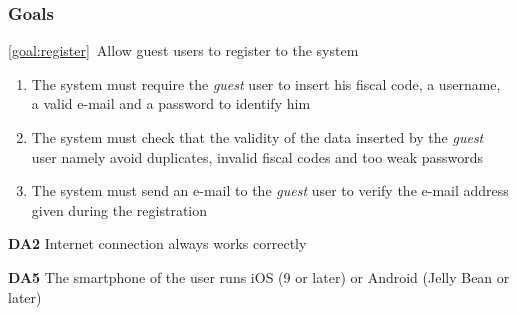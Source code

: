 \subsubsection{Goals}
	\begin{description}
		\item \ref{goal:register}\ Allow guest users to register to the system
			\begin{enumerate}[label=\textbf{R\arabic*}]
			
  				\item The system must require the \emph{guest} user to insert his fiscal code, a username, a valid e-mail and a password to identify him
  				
   				\item The system must check that the validity of the data inserted by the \emph{guest} user namely avoid duplicates, invalid fiscal codes and too weak passwords
   				
   				\item The system must send an e-mail to the \emph{guest} user to verify the e-mail address given during the registration
  			\end{enumerate}
  			
		
				\textbf{DA2} Internet connection always works correctly
				
				\textbf{DA5} The smartphone of the user runs iOS (9 or later) or Android (Jelly Bean or later)
			

\end{description}
